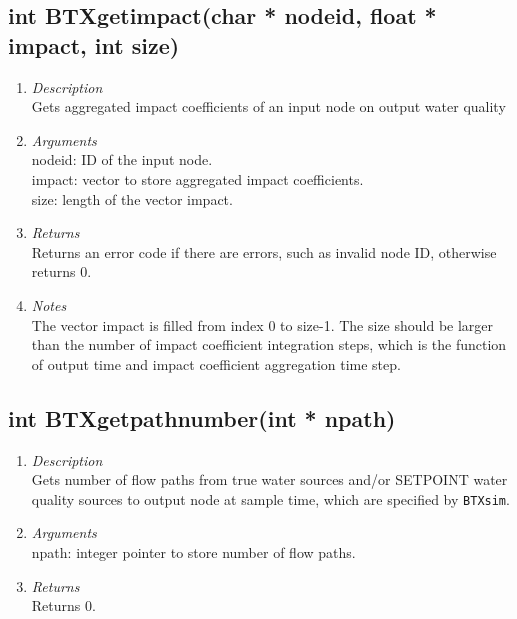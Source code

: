\documentclass[12pt,letterpaper]{article}
\begin{document}
\subsection*{int BTXgetimpact(char * nodeid, float * impact, int size)}
\begin{enumerate}
\item {\it Description}\\Gets aggregated impact coefficients of an input node on output water quality
\item {\it Arguments}\\
nodeid: ID of the input node. \\impact: vector to store aggregated
impact coefficients. \\size: length of the vector impact.
\item {\it Returns}\\Returns an error code if there are errors, such as invalid node ID, otherwise returns 0.
\item{\it Notes}\\The vector impact is filled from index 0 to
size-1. The size should be larger than the number of impact
coefficient integration steps, which is the function of output time
and impact coefficient aggregation time step.
\end{enumerate}

\subsection*{int BTXgetpathnumber(int * npath)}
\begin{enumerate}
\item {\it Description}\\Gets number of flow paths from true water
sources and/or SETPOINT water quality sources to output node at
sample time, which are specified by \texttt{BTXsim}.
\item {\it Arguments}\\
npath: integer pointer to store number of flow paths.
\item {\it Returns}\\Returns 0.
\end{enumerate}
\end{document}

